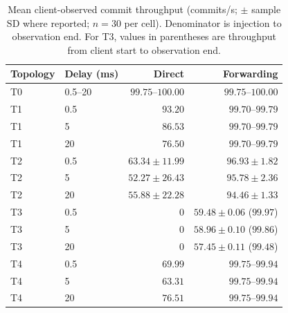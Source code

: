 \begin{table}[H]
  \centering
  \caption{Mean client-observed commit throughput (commits/s; \(\pm\) sample SD where reported; \(n=30\) per cell). Denominator is injection to observation end. For T3, values in parentheses are throughput from client start to observation end.}
  \label{tab:throughput}
  \footnotesize
  \begin{tabular}{llrr}
    \toprule
    Topology & Delay (ms) & Direct & Forwarding \\
    \midrule
    T0 & 0.5--20 & \(99.75\)--\(100.00\) & \(99.75\)--\(100.00\) \\
    T1 & 0.5 & \(93.20\) & \(99.70\)--\(99.79\) \\
    T1 & 5 & \(86.53\) & \(99.70\)--\(99.79\) \\
    T1 & 20 & \(76.50\) & \(99.70\)--\(99.79\) \\
    T2 & 0.5 & \(63.34\pm11.99\) & \(96.93\pm1.82\) \\
    T2 & 5 & \(52.27\pm26.43\) & \(95.78\pm2.36\) \\
    T2 & 20 & \(55.88\pm22.28\) & \(94.46\pm1.33\) \\
    T3 & 0.5 & \(0\) & \(59.48\pm0.06\) (\(99.97\)) \\
    T3 & 5 & \(0\) & \(58.96\pm0.10\) (\(99.86\)) \\
    T3 & 20 & \(0\) & \(57.45\pm0.11\) (\(99.48\)) \\
    T4 & 0.5 & \(69.99\) & \(99.75\)--\(99.94\) \\
    T4 & 5 & \(63.31\) & \(99.75\)--\(99.94\) \\
    T4 & 20 & \(76.51\) & \(99.75\)--\(99.94\) \\
    \bottomrule
  \end{tabular}
\end{table}

